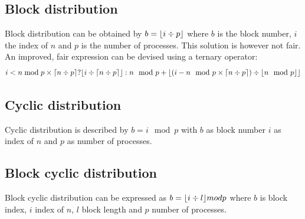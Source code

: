 \documentclass[a4paper,11pt,twoside]{article}
\DeclarePairedDelimiter{\ceil}{\lceil}{\rceil}
\DeclarePairedDelimiter{\floor}{\lfloor}{\rfloor}
\begin{document}
\subsection*{Block distribution}
Block distribution can be obtained by $b = \floor*{i \div p}$ where $b$ is the block number, $i$ the index of $n$ and $p$ is the number of processes. This solution is however not fair. An improved, fair expression can be devised using a ternary operator:
\begin{equation*}
i< n\bmod p \times \ceil*{n \div p} ? \floor*{i \div \ceil*{n \div p}} : n\mod p + \floor*{(i -n\mod p \times \ceil*{n \div p}) \div \floor*{n\mod p}}
\end{equation*} 

\subsection*{Cyclic distribution}
Cyclic distribution is described by $b = i\mod p$ with $b$ as block number $i$ as index of $n$ and $p$ as number of processes. 

\subsection*{Block cyclic distribution}
Block cyclic distribution can be expressed as $b = \floor*{i \div l} mod p$ where $b$ is block index, $i$ index of $n$, $l$ block length and $p$ number of processes.
\end{document}
